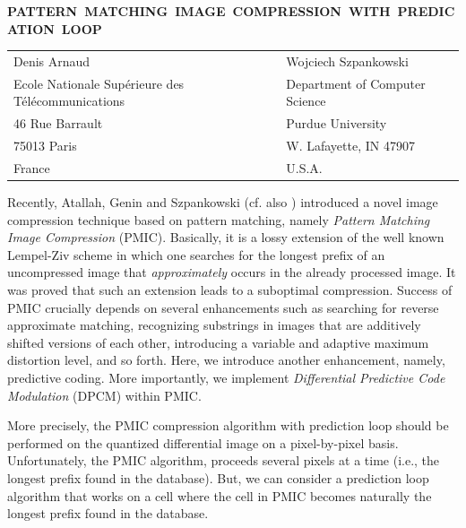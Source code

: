 \noi
{\bf PATTERN~MATCHING~IMAGE~COMPRESSION~WITH~PREDICATION~LOOP}
\med
\begin{tabular}{ll}
Denis Arnaud&Wojciech Szpankowski\footnotemark\\
Ecole Nationale Sup\'{e}rieure des T\'{e}l\'{e}communications&Department of Computer Science\\
46 Rue Barrault&Purdue University\\
75013 Paris&W. Lafayette, IN 47907\\
France&U.S.A.\\
\end{tabular}
\par
\bigskip
Recently, Atallah, Genin and Szpankowski \cite{ags} (cf. also \cite{cs})
introduced a novel image compression technique based on
pattern matching, namely {\it Pattern Matching Image Compression}
(PMIC). Basically, it is a lossy extension of the  well known
Lempel-Ziv scheme in which one searches for the
longest prefix of an uncompressed image that {\it approximately}
occurs in the already processed image.
It was proved
that such an extension leads to a suboptimal compression. 
Success of PMIC crucially depends on several enhancements such as
searching for reverse approximate matching, recognizing substrings in
images that are additively shifted versions of each other, introducing
a variable and adaptive maximum distortion level, and so forth.
Here, we introduce another enhancement, namely, predictive coding.
More importantly, we implement {\it Differential Predictive Code Modulation}
(DPCM) within PMIC. 

More precisely, the PMIC compression algorithm with prediction loop 
should be performed on the quantized differential image on a 
pixel-by-pixel basis. 
Unfortunately, the PMIC algorithm,
proceeds several pixels at a time (i.e., the longest prefix
found in the database). 
But, we can consider a prediction loop algorithm that works
on a cell where the cell in PMIC becomes naturally the longest prefix 
found in the database.

